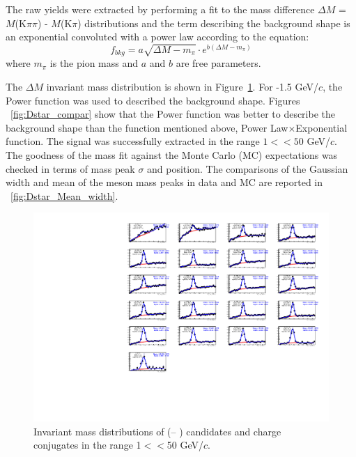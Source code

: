 The \Dstar raw yields were extracted by performing a fit to the mass difference $\Delta M$ = $M$(K$\pi\pi$) - $M$(K$\pi$) distributions and the term describing the background shape is an exponential convoluted with a power law according to the equation:
\begin{equation}
	f_{bkg} = a\sqrt{\Delta M - m_{\pi}}\cdot e^{b(\Delta M - m_{\pi})}
\end{equation}
where $m_{\pi}$ is the pion mass and $a$ and $b$ are free parameters.

The \Dstar $\Delta M$ invariant mass distribution is shown in Figure~\ref{fig:Dstar_InvMass}. For -1.5 GeV/$c$, the Power function was used to described the background shape. Figures ~\ref{fig:Dstar_compar} show that the Power function was better to describe the background shape than the function mentioned above, Power Law$\times$Exponential function. The \Dstar signal was successfully extracted in the range $1<$\pt$<50$ GeV/$c$. The goodness of the mass fit against the Monte Carlo (MC) expectations was checked in terms of mass peak $\sigma$ and position.
The comparisons of the Gaussian width and mean of the \Dstar meson mass peaks in data and MC are reported in ~\ref{fig:Dstar_Mean_width}.


\begin{figure}[tb]
\begin{center}
 \includegraphics[width=1\textwidth]{figures/Dstar/pp13TeV/DstarInvMass_new.pdf}
\caption{Invariant mass distributions of  (\Dstar -- \Dzero) candidates and charge conjugates in the range 1$<$\pt$<$50 GeV/$c$.}
\label{fig:Dstar_InvMass}
\end{center}
\end{figure}


